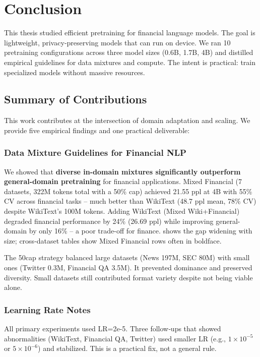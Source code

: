 \chapter{Conclusion}

This thesis studied efficient pretraining for financial language models. The goal is lightweight, privacy‑preserving models that can run on device. We ran 10 pretraining configurations across three model sizes (0.6B, 1.7B, 4B) and distilled empirical guidelines for data mixtures and compute. The intent is practical: train specialized models without massive resources.

\section{Summary of Contributions}

This work contributes at the intersection of domain adaptation and scaling. We provide five empirical findings and one practical deliverable:

\subsection{Data Mixture Guidelines for Financial NLP}

We showed that \textbf{diverse in-domain mixtures significantly outperform general-domain pretraining} for financial applications. Mixed Financial (7 datasets, 322M tokens total with a 50\% cap) achieved 21.55 ppl at 4B with 55\% CV across financial tasks -- much better than WikiText (48.7 ppl mean, 78\% CV) despite WikiText's 100M tokens. Adding WikiText (Mixed Wiki+Financial) degraded financial performance by 24\% (26.69 ppl) while improving general-domain by only 16\% -- a poor trade-off for finance.  shows the gap widening with size; cross-dataset tables show Mixed Financial rows often in boldface.

The 50cap strategy balanced large datasets (News 197M, SEC 80M) with small ones (Twitter 0.3M, Financial QA 3.5M). It prevented dominance and preserved diversity. Small datasets still contributed format variety despite not being viable alone.

\subsection{Learning Rate Notes}

All primary experiments used LR=2e-5. Three follow‑ups that showed abnormalities (WikiText, Financial QA, Twitter) used smaller LR (e.g., $1\times10^{-5}$ or $5\times10^{-6}$) and stabilized. This is a practical fix, not a general rule.

